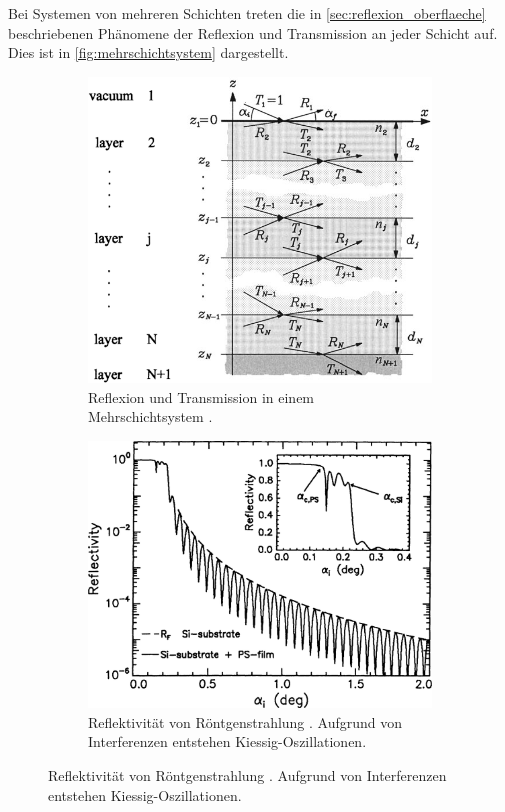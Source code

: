 Bei Systemen von mehreren Schichten treten die in \autoref{sec:reflexion_oberflaeche} beschriebenen Phänomene der Reflexion und Transmission an jeder Schicht auf.
Dies ist in \autoref{fig:mehrschichtsystem} dargestellt.
\begin{figure}
    \centering
    \begin{subfigure}{0.48\textwidth}
        \centering
        \includegraphics[width=\textwidth]{content/img/Tolan_2.6.png}
        \caption{Reflexion und Transmission in einem Mehrschichtsystem \cite{tolan}.}
        \label{fig:mehrschichtsystem}
    \end{subfigure}
    \hfill
    \begin{subfigure}{0.48\textwidth}
        \centering
        \includegraphics[width=\textwidth]{content/img/Tolan_2.7.png}
        \caption{
            Reflektivität von Röntgenstrahlung \cite{tolan}.
            Aufgrund von Interferenzen entstehen Kiessig-Oszillationen.
        }
        \label{fig:kiessig_oszillationen}
    \end{subfigure}
\end{figure}
